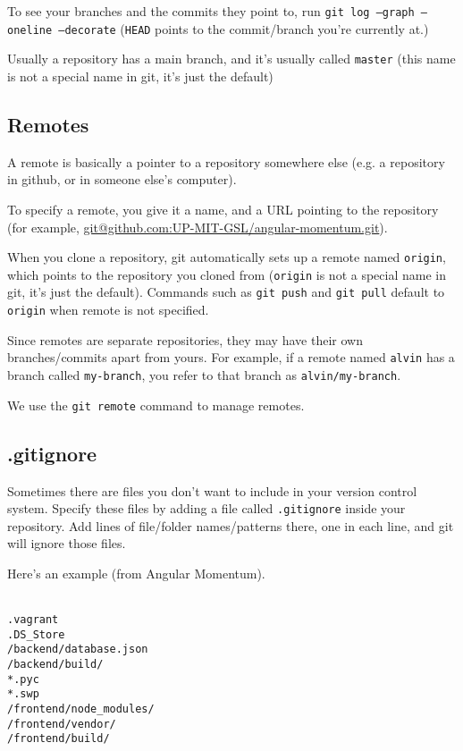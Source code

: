 \documentclass[12pt]{article}
\begin{document}
To see your branches and the commits they point to, run \texttt{git log --graph --oneline --decorate} (\texttt{HEAD} points to the commit/branch you're currently at.)

Usually a repository has a main branch, and it's usually called \texttt{master} (this name is not a special name in git, it's just the default)

\subsection{Remotes}
A remote is basically a pointer to a repository somewhere else (e.g. a repository in github, or in someone else's computer).

To specify a remote, you give it a name, and a URL pointing to the repository (for example, \url{git@github.com:UP-MIT-GSL/angular-momentum.git}).

When you clone a repository, git automatically sets up a remote named \texttt{origin}, which points to the repository you cloned from (\texttt{origin} is not a special name in git, it's just the default). Commands such as \texttt{git push} and \texttt{git pull} default to \texttt{origin} when remote is not specified.

Since remotes are separate repositories, they may have their own branches/commits apart from yours. For example, if a remote named \texttt{alvin} has a branch called \texttt{my-branch}, you refer to that branch as \texttt{alvin/my-branch}.

We use the \texttt{git remote} command to manage remotes.

\subsection{.gitignore}
Sometimes there are files you don't want to include in your version control system. Specify these files by adding a file called \texttt{.gitignore} inside your repository. Add lines of file/folder names/patterns there, one in each line, and git will ignore those files.

Here's an example (from Angular Momentum).

\texttt{\\
.vagrant\\
.DS\_Store\\
/backend/database.json\\
/backend/build/\\
*.pyc\\
*.swp\\
/frontend/node\_modules/\\
/frontend/vendor/\\
/frontend/build/
}
\end{document}

